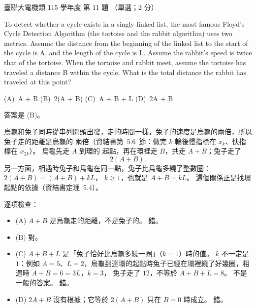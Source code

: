 \begin{pastexam}[label={px:ust-115-ee-ds-11}]{臺聯大電機類 115 學年度 第 11 題}
（單選；2 分）

To detect whether a cycle exists in a singly linked list, the most famous Floyd's Cycle Detection
Algorithm (the tortoise and the rabbit algorithm) uses two metrics. Assume the distance from the
beginning of the linked list to the start of the cycle is A, and the length of the cycle is L.
Assume the rabbit's speed is twice that of the tortoise. When the tortoise and rabbit meet, assume
the tortoise has traveled a distance B within the cycle. What is the total distance the rabbit has
traveled at this point?

(A)~A + B \qquad (B)~2(A + B) \qquad (C)~A + B + L \qquad (D)~2A + B
\end{pastexam}

\begin{pastsoln}
答案是 (B)。

烏龜和兔子同時從串列開頭出發，走的時間一樣，兔子的速度是烏龜的兩倍，所以兔子走的距離是烏龜的
兩倍（資結書第~5.6~節：做完 $k$ 輪後慢指標在 $x_k$、快指標在 $x_{2k}$）。 烏龜先走 $A$ 到環的
起點，再在環裡走 $B$，共走 $A + B$；兔子走了
\[
2(A + B) .
\]
另一方面，相遇時兔子和烏龜在同一點，兔子比烏龜多繞了整數圈：$2(A + B) = (A + B) + kL$，
$k \ge 1$，也就是 $A + B = kL$。 這個關係正是找環起點的依據（資結書定理~5.4）。

逐項檢查：
\begin{itemize}
\item (A) $A + B$ 是烏龜走的距離，不是兔子的。 錯。
\item (B) 對。
\item (C) $A + B + L$ 是「兔子恰好比烏龜多繞一圈」（$k = 1$）時的值。 $k$ 不一定是 $1$：例如
$A = 5$、$L = 2$，烏龜到達環的起點時兔子已經在環裡繞了好幾圈，相遇時 $A + B = 6 = 3L$，$k = 3$，
兔子走了 $12$，不等於 $A + B + L = 8$。 不是一般的答案。 錯。
\item (D) $2A + B$ 沒有根據；它等於 $2(A+B)$ 只在 $B = 0$ 時成立。 錯。
\end{itemize}
\end{pastsoln}
